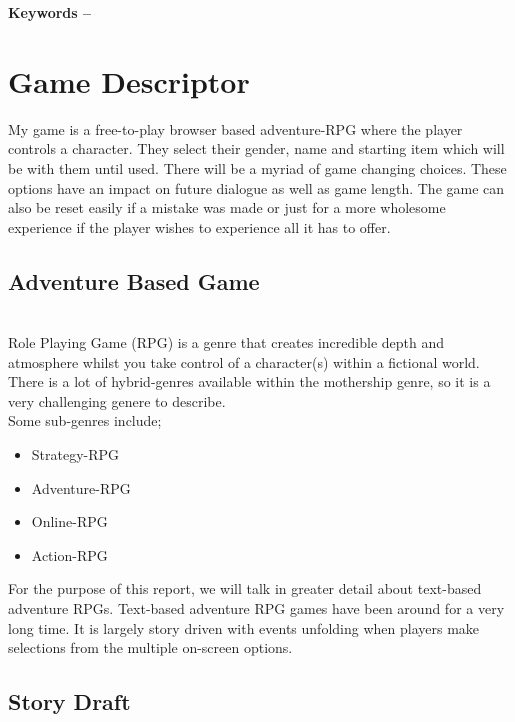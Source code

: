\documentclass[10pt, a4paper]{article}
\title{\mytitle}
\author{\myauthor\hspace{1em}\\\contact\\Edinburgh Napier University\hspace{0.5em}-\hspace{0.5em}\mymodule}
\date{}
\begin{document}
    \maketitle
    \begin{abstract}
        \lipsum[2]
    \end{abstract}
    
    \textbf{Keywords -- }{\mykeywords}
    
    \section{Game Descriptor}
	My game is a free-to-play browser based adventure-RPG where the player controls a character. They select their gender,
	name and starting item which will be with them until used. There will be a myriad of game changing choices. 
	These options have an impact on future dialogue as well as game length. The game can also be reset easily if a mistake
	was made or just for a more wholesome experience if the player wishes to experience all it has to offer.
	
	\subsection{Adventure Based Game}
	\\
	Role Playing Game (RPG) is a genre that creates incredible depth and atmosphere whilst you take control of a character(s)
	within a fictional world. There is a lot of hybrid-genres available within the mothership genre, so it is a very
	challenging genere to describe.\\
	Some sub-genres include; 
	\begin{itemize}
		\item Strategy-RPG
		\item Adventure-RPG
		\item Online-RPG
		\item Action-RPG
	\end{itemize}
	For the purpose of this report, we will talk in greater detail about text-based adventure RPGs.
	Text-based adventure RPG games have been around for a very long time. It is largely story driven
	with events unfolding when players make selections from the multiple on-screen options.
	
	\subsection{Story Draft}
\end{document}
